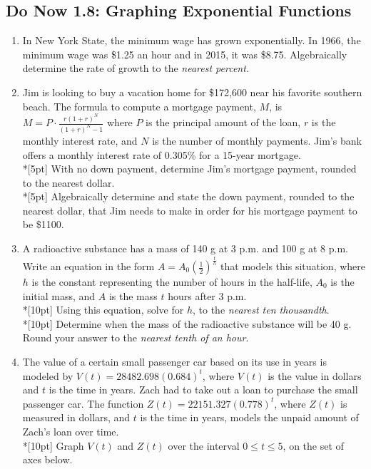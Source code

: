 \documentclass[12pt, oneside]{article}
\begin{document}
\subsection*{Do Now 1.8: Graphing Exponential Functions}
\begin{enumerate}

  \item %
  In New York State, the minimum wage has grown exponentially. In 1966, the minimum wage was \$1.25 an hour and in 2015, it was \$8.75. Algebraically determine the rate of growth to the \textit{nearest percent}.

  \item %
  Jim is looking to buy a vacation home for \$172,600 near his favorite southern beach. The formula to compute a mortgage payment, $M$, is $\displaystyle M=P \cdot \frac{r(1+r)^N}{(1+r)^N-1}$ where $P$ is the principal amount of the loan, $r$ is the monthly interest rate, and $N$ is the number of monthly payments. Jim's bank offers a monthly interest rate of 0.305\% for a 15-year mortgage.\\*[5pt]
  With no down payment, determine Jim's mortgage payment, rounded to the nearest dollar.\\*[5pt]
  Algebraically determine and state the down payment, rounded to the nearest dollar, that Jim needs to make in order for his mortgage payment to be \$1100.

  \item %
  A radioactive substance has a mass of 140 g at 3 p.m. and 100 g at 8 p.m. Write an equation in the form $\displaystyle A = A_0 \left( \frac{1}{2}\right) ^\frac{t}{h}$ that models this situation, where $h$ is the constant representing the number of hours in the half-life, $A_0$ is the initial mass, and $A$ is the mass $t$ hours after 3 p.m.\\*[10pt]
  Using this equation, solve for $h$, to the \textit{nearest ten thousandth}.\\*[10pt]
  Determine when the mass of the radioactive substance will be 40 g. Round your answer to the \textit{nearest tenth of an hour}.

  \newpage %
  \item %
  The value of a certain small passenger car based on its use in years is modeled by $V(t) =28482.698(0.684)^t$,
  where $V(t)$ is the value in dollars and $t$ is the time in years.
  Zach had to take out a loan to purchase the small passenger car. The function $Z(t) = 22151.327(0.778)^t$, where $Z(t)$ is measured in dollars,
  and $t$ is the time in years, models the unpaid amount of Zach's loan over time.\\*[10pt]
  Graph $V(t)$ and $Z(t)$ over the interval $0 \leq t \leq 5$, on the set of axes below.


\end{enumerate}
\end{document}
